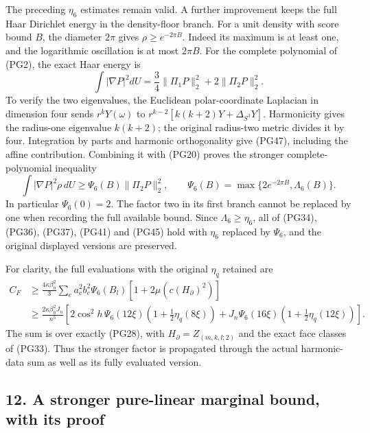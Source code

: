 \documentclass[11pt]{article}
\begin{document}
The preceding \(\eta_6\) estimates remain valid. A further improvement
keeps the full Haar Dirichlet energy in the density-floor branch.
For a unit density with score bound \(B\), the diameter \(2\pi\)
gives \(\rho\ge e^{-2\pi B}\). Indeed its maximum is at least one,
and the logarithmic oscillation is at most \(2\pi B\).
For the complete polynomial of (PG2), the exact Haar energy is
\[
 \int|\nabla P|^2dU
   =\frac34\|\Pi_1P\|_2^2+2\|\Pi_2P\|_2^2 .
 \tag{PG47}
\]
To verify the two eigenvalues, the Euclidean polar-coordinate
Laplacian in dimension four sends \(r^kY(\omega)\) to
\(r^{k-2}[k(k+2)Y+\Delta_{S^3}Y]\). Harmonicity gives the
radius-one eigenvalue \(k(k+2)\); the original radius-two metric
divides it by four. Integration by parts and harmonic
orthogonality give (PG47), including the affine contribution.
Combining it with (PG20) proves the stronger complete-polynomial
inequality
\[
 \boxed{\int|\nabla P|^2\rho\,dU
        \ge\Psi_6(B)\|\Pi_2P\|_2^2,\qquad
 \Psi_6(B)=\max\{2e^{-2\pi B},\Lambda_6(B)\}.}
 \tag{PG48}
\]
In particular \(\Psi_6(0)=2\). The factor two in its first branch
cannot be replaced by one when recording the full available bound.
Since \(\Lambda_6\ge\eta_6\), all of (PG34), (PG36), (PG37),
(PG41) and (PG45) hold with \(\eta_6\) replaced by \(\Psi_6\),
and the original displayed versions are preserved.

For clarity, the full evaluations with the original \(\eta_q\)
retained are
\[
 \begin{aligned}
 C_F&\ge\frac{4\kappa\beta_0^2}{3}
       \sum_ea_e^2b_e^2\Psi_6(B_l)
                       [1+2\mu(c(H_\partial)^2)]\\
 &\ge\frac{2\kappa\beta_0^2J_n}{n^5}
 \left[
 2\cos^2h\,\Psi_6(12\xi)(1+\tfrac12\eta_q(8\xi))
 +J_n\Psi_6(16\xi)(1+\tfrac12\eta_q(12\xi))
 \right].
 \end{aligned}\tag{PG49}
\]
The sum is over exactly (PG28), with \(H_\partial=Z_{(m,k,l;2)}\)
and the exact face classes of (PG33). Thus the stronger factor is
propagated through the actual harmonic-data sum as well as its
fully evaluated version.

\subsection*{12. A stronger pure-linear marginal bound, with its proof}
\end{document}

